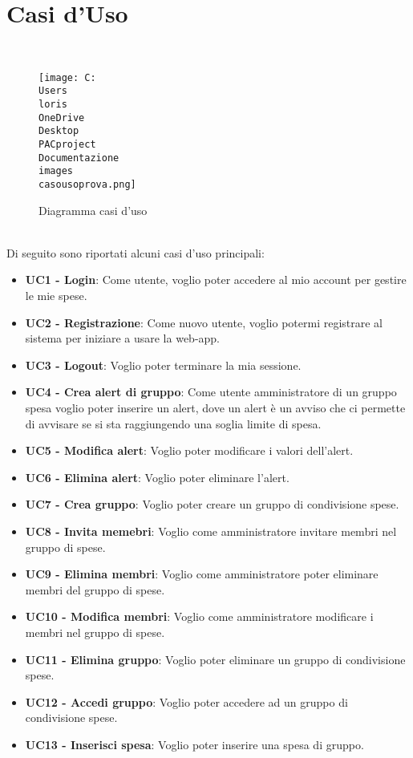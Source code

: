 \section{Casi d'Uso}
\\
    \begin{figure}[h]
        \centering
        \texttt{[image: C:\\Users\\loris\\OneDrive\\Desktop\\PACproject\\Documentazione\\images\\casousoprova.png]}
        \caption{Diagramma casi d'uso }
    \end{figure}
\\
Di seguito sono riportati alcuni casi d'uso principali:
\begin{itemize}
    \item \textbf{UC1 - Login}: Come utente, voglio poter accedere al mio account per gestire le mie spese.
    \item \textbf{UC2 - Registrazione}: Come nuovo utente, voglio potermi registrare al sistema per iniziare a usare la web-app.
    \item \textbf{UC3 - Logout}: Voglio poter terminare la mia sessione.
    \item \textbf{UC4 - Crea alert di gruppo}: Come utente amministratore di un gruppo spesa voglio poter inserire un alert, dove un alert è un avviso che ci permette di avvisare se si sta raggiungendo una soglia limite di spesa.
    \item \textbf{UC5 - Modifica alert}: Voglio poter modificare i valori dell'alert.
    \item \textbf{UC6 - Elimina alert}: Voglio poter eliminare l'alert. 
    \item \textbf{UC7 - Crea gruppo}: Voglio poter creare un gruppo di condivisione spese. 
    \item \textbf{UC8 - Invita memebri}: Voglio come amministratore invitare membri nel gruppo di spese.
    \item \textbf{UC9 - Elimina membri}: Voglio come amministratore poter eliminare membri del gruppo di spese.
    \item \textbf{UC10 - Modifica membri}: Voglio come amministratore modificare i membri nel gruppo di spese.
    \item \textbf{UC11 - Elimina gruppo}: Voglio poter eliminare un gruppo di condivisione spese. 
    \item \textbf{UC12 - Accedi gruppo}: Voglio poter accedere ad un gruppo di condivisione spese. 
    \item \textbf{UC13 - Inserisci spesa}: Voglio poter inserire una spesa di gruppo.

\end{itemize}
